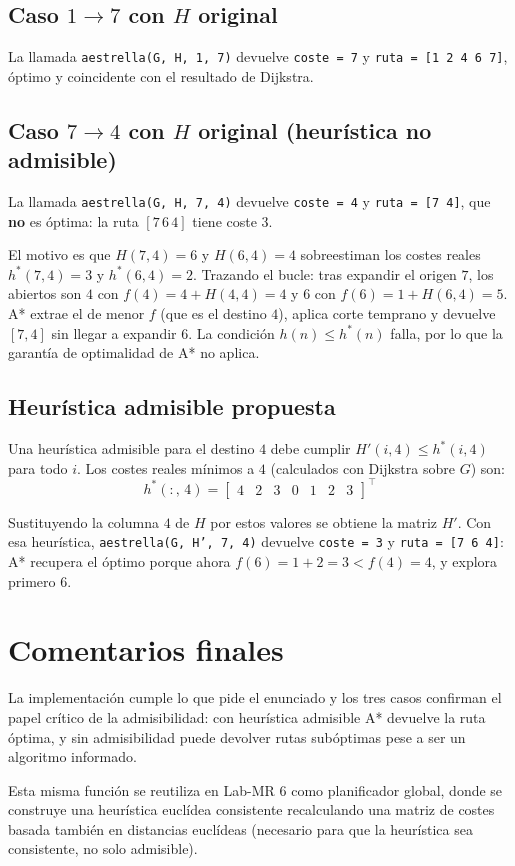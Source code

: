 \subsection{Caso $1\to 7$ con $H$ original}
La llamada \texttt{aestrella(G, H, 1, 7)} devuelve \texttt{coste = 7} y \texttt{ruta = [1 2 4 6 7]}, \'{o}ptimo y coincidente con el resultado de Dijkstra.

\subsection{Caso $7\to 4$ con $H$ original (heur\'{i}stica no admisible)}
La llamada \texttt{aestrella(G, H, 7, 4)} devuelve \texttt{coste = 4} y \texttt{ruta = [7 4]}, que \textbf{no} es \'{o}ptima: la ruta $[7\,6\,4]$ tiene coste $3$.

El motivo es que $H(7,4) = 6$ y $H(6,4) = 4$ sobreestiman los costes reales $h^*(7,4) = 3$ y $h^*(6,4) = 2$. Trazando el bucle: tras expandir el origen $7$, los abiertos son $4$ con $f(4) = 4 + H(4,4) = 4$ y $6$ con $f(6) = 1 + H(6,4) = 5$. A* extrae el de menor $f$ (que es el destino $4$), aplica corte temprano y devuelve $[7,4]$ sin llegar a expandir $6$. La condici\'{o}n $h(n) \leq h^*(n)$ falla, por lo que la garant\'{i}a de optimalidad de A* no aplica.

\subsection{Heur\'{i}stica admisible propuesta}
Una heur\'{i}stica admisible para el destino $4$ debe cumplir $H'(i, 4) \leq h^*(i, 4)$ para todo $i$. Los costes reales m\'{i}nimos a $4$ (calculados con Dijkstra sobre $G$) son:
\begin{equation*}
  h^*(:,\,4) = \begin{bmatrix} 4 & 2 & 3 & 0 & 1 & 2 & 3 \end{bmatrix}^{\!\top}
\end{equation*}

Sustituyendo la columna $4$ de $H$ por estos valores se obtiene la matriz $H'$. Con esa heur\'{i}stica, \texttt{aestrella(G, H', 7, 4)} devuelve \texttt{coste = 3} y \texttt{ruta = [7 6 4]}: A* recupera el \'{o}ptimo porque ahora $f(6) = 1 + 2 = 3 < f(4) = 4$, y explora primero $6$.


\section{Comentarios finales}

La implementaci\'{o}n cumple lo que pide el enunciado y los tres casos confirman el papel cr\'{i}tico de la admisibilidad: con heur\'{i}stica admisible A* devuelve la ruta \'{o}ptima, y sin admisibilidad puede devolver rutas sub\'{o}ptimas pese a ser un algoritmo informado.

Esta misma funci\'{o}n se reutiliza en Lab-MR 6 como planificador global, donde se construye una heur\'{i}stica eucl\'{i}dea consistente recalculando una matriz de costes basada tambi\'{e}n en distancias eucl\'{i}deas (necesario para que la heur\'{i}stica sea consistente, no solo admisible).
